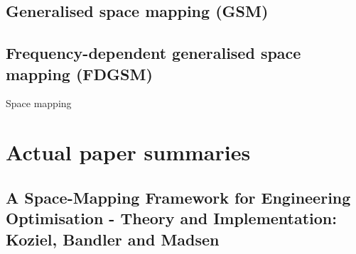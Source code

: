 \subsection{Generalised space mapping (GSM)}
\subsection{Frequency-dependent generalised space mapping (FDGSM)}
Space mapping



\section{Actual paper summaries}
\subsection{A Space-Mapping Framework for Engineering Optimisation - Theory and Implementation: Koziel, Bandler and Madsen \cite{SMFrameworkKoziel} }
